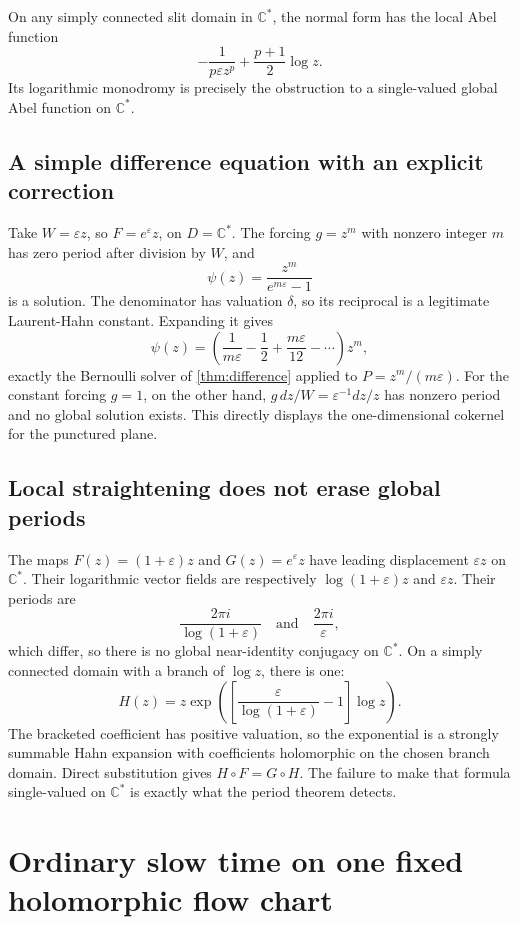 \documentclass[11pt,a4paper]{article}
\numberwithin{equation}{section}
\theoremstyle{definition}
\theoremstyle{remark}
\newcommand{\C}{\mathbb C}
\newcommand{\eps}{\varepsilon}
\begin{document}
On any simply connected slit domain in $\C^*$, the normal form has the
local Abel function
\[
 -\frac1{p\eps z^p}+\frac{p+1}{2}\log z.
\]
Its logarithmic monodromy is precisely the obstruction to a single-valued
global Abel function on $\C^*$.

\subsection{A simple difference equation with an explicit correction}

Take $W=\eps z$, so $F=e^\eps z$, on $D=\C^*$.  The forcing $g=z^m$
with nonzero integer $m$ has zero period after division by $W$, and
\[
 \psi(z)=\frac{z^m}{e^{m\eps}-1}
\]
is a solution.  The denominator has valuation $\delta$, so its reciprocal
is a legitimate Laurent-Hahn constant.  Expanding it gives
\[
 \psi(z)=\left(\frac1{m\eps}-\frac12
                    +\frac{m\eps}{12}-\cdots\right)z^m,
\]
exactly the Bernoulli solver of \cref{thm:difference} applied to
$P=z^m/(m\eps)$.  For the constant forcing $g=1$, on the other hand,
$g\,dz/W=\eps^{-1}dz/z$ has nonzero period and no global solution exists.
This directly displays the one-dimensional cokernel for the punctured plane.

\subsection{Local straightening does not erase global periods}

The maps $F(z)=(1+\eps)z$ and $G(z)=e^\eps z$ have leading displacement
$\eps z$ on $\C^*$.  Their logarithmic vector fields are respectively
$\log(1+\eps)z$ and $\eps z$.  Their periods are
\[
 \frac{2\pi i}{\log(1+\eps)}\quad\text{and}\quad\frac{2\pi i}{\eps},
\]
which differ, so there is no global near-identity conjugacy on $\C^*$.
On a simply connected domain with a branch of $\log z$, there is one:
\[
 H(z)=z\exp\left(\left[\frac{\eps}{\log(1+\eps)}-1\right]\log z\right).
\]
The bracketed coefficient has positive valuation, so the exponential is a
strongly summable Hahn expansion with coefficients holomorphic on the chosen
branch domain.  Direct substitution gives $H\circ F=G\circ H$.
The failure to make that formula single-valued on $\C^*$ is exactly what
the period theorem detects.

\section{Ordinary slow time on one fixed holomorphic flow chart}
\label{sec:slowtime}
\end{document}
